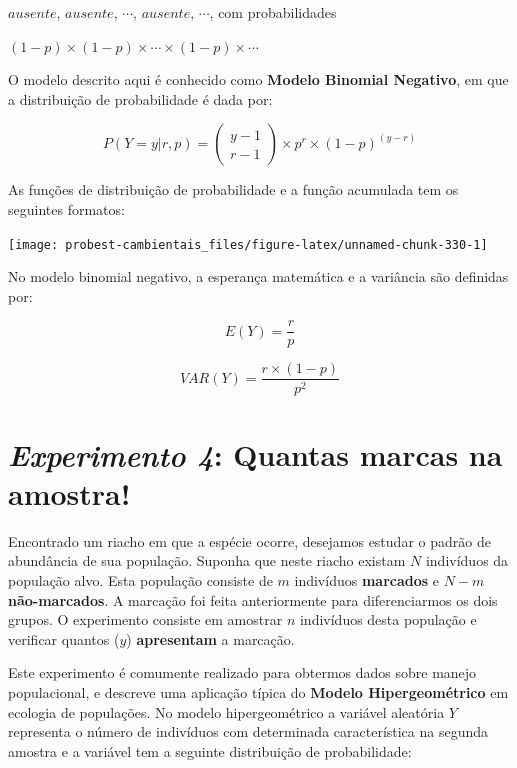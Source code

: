 \documentclass[
]{book}
\begin{document}
\(ausente\), \(ausente\), \(\cdots\), \(ausente\), \(\cdots\), com probabilidades

\((1-p) \times (1-p) \times \cdots \times (1-p) \times \cdots\)

O modelo descrito aqui é conhecido como \textbf{Modelo Binomial Negativo}, em que a distribuição de probabilidade é dada por:

\[P(Y = y|r,p) = \left (\begin{array}{c}
y - 1 \\
r - 1
\end{array}\right) \times p^{r} \times (1-p)^{(y-r)}\]

As funções de distribuição de probabilidade e a função acumulada tem os seguintes formatos:

\begin{center}\texttt{[image: probest-cambientais\_files/figure-latex/unnamed-chunk-330-1]} \end{center}

No modelo binomial negativo, a esperança matemática e a variância são definidas por:

\[E(Y) = \frac{r}{p}\]

\[VAR(Y) = \frac{r \times (1-p)}{p^2}\]

\hypertarget{experimento-4-quantas-marcas-na-amostra}{%
\section{\texorpdfstring{\emph{Experimento 4}: Quantas marcas na amostra!}{Experimento 4: Quantas marcas na amostra!}}\label{experimento-4-quantas-marcas-na-amostra}}

Encontrado um riacho em que a espécie ocorre, desejamos estudar o padrão de abundância de sua população. Suponha que neste riacho existam \(N\) indivíduos da população alvo. Esta população consiste de \(m\) indivíduos \textbf{marcados} e \(N-m\) \textbf{não-marcados}. A marcação foi feita anteriormente para diferenciarmos os dois grupos. O experimento consiste em amostrar \(n\) indivíduos desta população e verificar quantos (\(y\)) \textbf{apresentam} a marcação.

Este experimento é comumente realizado para obtermos dados sobre manejo populacional, e descreve uma aplicação típica do \textbf{Modelo Hipergeométrico} em ecologia de populações. No modelo hipergeométrico a variável aleatória \(Y\) representa o número de indivíduos com determinada característica na segunda amostra e a variável tem a seguinte distribuição de probabilidade:
\end{document}
